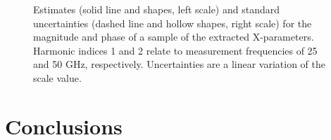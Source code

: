 \documentclass[../thesis/thesis.tex]{subfiles}
\begin{document}
\begin{refsection}
\begin{figure}
\begin{subfigure}{0.45\textwidth}
		\label{ch5_fig_t212kp}
	\end{subfigure}
	\caption{Estimates (solid line and shapes, left scale) and standard uncertainties (dashed line and hollow shapes, right scale) for the magnitude and phase of a sample of the extracted X-parameters. Harmonic indices 1 and 2 relate to measurement frequencies of 25 and 50 GHz, respectively. Uncertainties are a linear variation of the scale value.}
	\label{ch5_fig_summaryplots}
\end{figure}

\section{Conclusions}

\printbibliography[title=References]
\end{refsection}
\end{document}
